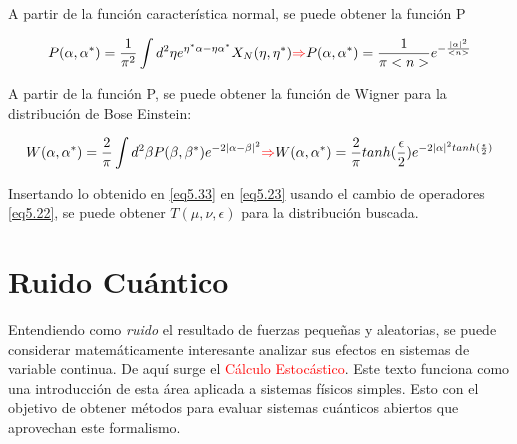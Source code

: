 \documentclass{book}
\begin{document}
A partir de la función característica normal, se puede obtener la función P

\begin{equation}\label{eq5.32}P(\alpha,\alpha^*)=\frac{1}{\pi^2}\int d^2\eta e^{\eta^*\alpha-\eta\alpha^*}X_N(\eta,\eta^*)\textcolor{red}{\Rightarrow} P(\alpha,\alpha^*)=\frac{1}{\pi <n>}e^{-\frac{\lvert\alpha\rvert^2}{<n>}}\end{equation}

A partir de la función P, se puede obtener la función de Wigner para la distribución de Bose Einstein:

\begin{equation}\label{eq5.33}W(\alpha,\alpha^*)=\frac{2}{\pi}\int d^2\beta P(\beta, \beta^*)e^{-2\lvert\alpha-\beta\rvert^2} \textcolor{red}{\Rightarrow} W(\alpha,\alpha^*)=\frac{2}{\pi}tanh(\frac{\epsilon}{2})e^{-2\lvert\alpha\rvert^2tanh(\frac{\epsilon}{2})}\end{equation}
 
Insertando lo obtenido en \ref{eq5.33} en \ref{eq5.23} usando el cambio de operadores \ref{eq5.22}, se puede obtener $T(\mu,\nu,\epsilon)$ para la distribución buscada.
\chapter{Ruido Cuántico}
Entendiendo como \textit{ruido} el resultado de fuerzas pequeñas y aleatorias, se puede considerar matemáticamente interesante analizar sus efectos en sistemas de variable continua. De aquí surge el \textcolor{red}{Cálculo Estocástico}.
Este texto funciona como una introducción de esta área aplicada a sistemas físicos simples. Esto con el objetivo de obtener métodos para evaluar sistemas cuánticos abiertos que aprovechan este formalismo.
\end{document}
